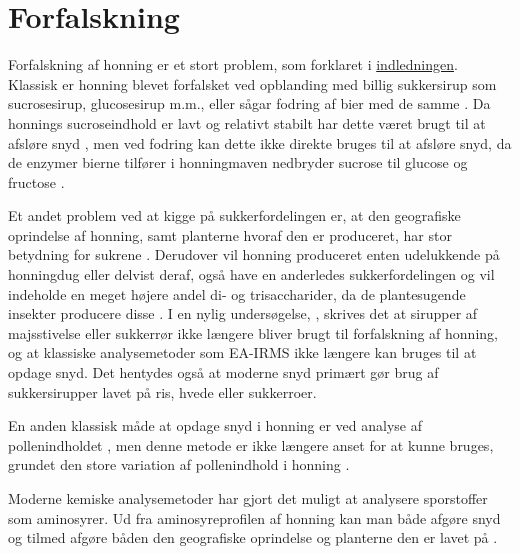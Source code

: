 \section{Forfalskning}
Forfalskning af honning er et stort problem, som forklaret i \hyperlink{chap:indledning}{indledningen}.
Klassisk er honning blevet forfalsket ved opblanding med billig sukkersirup som sucrosesirup, glucosesirup m.m., eller sågar fodring af bier med de samme \parencite{sugarhoney}.
Da honnings sucroseindhold er lavt og relativt stabilt har dette været brugt til at afsløre snyd \parencite{saccharosehoney},
men ved fodring kan dette ikke direkte bruges til at afsløre snyd, da de enzymer bierne tilfører i honningmaven nedbryder sucrose til glucose og fructose \parencite{biochemprophoney,sugarhoney}.
\par Et andet problem ved at kigge på sukkerfordelingen er, at den geografiske oprindelse af honning, samt planterne hvoraf den er produceret, har stor betydning for sukrene \parencite{geohoney}.
Derudover vil honning produceret enten udelukkende på honningdug eller delvist deraf, også have en anderledes sukkerfordelingen og vil indeholde en meget højere andel di- og trisaccharider, da de plantesugende insekter producere disse \parencite{sugarhoney}.
\renewcommand*{\thefootnote}{\fnsymbol{footnote}}
I en nylig undersøgelse, \textcite{EUhoney}, skrives det at sirupper af majsstivelse eller sukkerrør ikke længere bliver brugt til forfalskning af honning, og at klassiske analysemetoder som EA-IRMS\footnotemark[1]{} ikke længere kan bruges til at opdage snyd.
Det hentydes også at moderne snyd primært gør brug af sukkersirupper lavet på ris, hvede eller sukkerroer.
\renewcommand*{\thefootnote}{\arabic{footnote}}
\par En anden klassisk måde at opdage snyd i honning er ved analyse af pollenindholdet \parencite{honeyindentification,pollenhoney}, men denne metode er ikke længere anset for at kunne bruges, grundet den store variation af pollenindhold i honning \parencite{authhoney}.
\par Moderne kemiske analysemetoder har gjort det muligt at analysere sporstoffer som aminosyrer.
Ud fra aminosyreprofilen af honning kan man både afgøre snyd \parencite{adulterationhoney} og tilmed afgøre båden den geografiske oprindelse og planterne den er lavet på \parencite{geohoney}.
